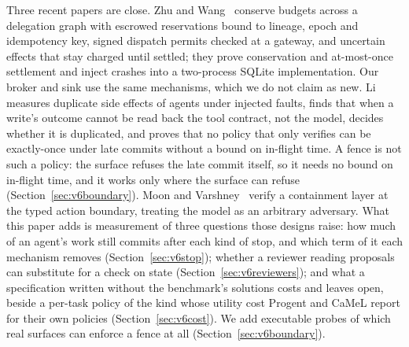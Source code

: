  Three recent papers are close. Zhu and Wang~\cite{ftbudget} conserve budgets across a delegation graph with escrowed reservations bound to lineage, epoch and idempotency key, signed dispatch permits checked at a gateway, and uncertain effects that stay charged until settled; they prove conservation and at-most-once settlement and inject crashes into a two-process SQLite implementation. Our broker and sink use the same mechanisms, which we do not claim as new. Li~\cite{limbo} measures duplicate side effects of agents under injected faults, finds that when a write's outcome cannot be read back the tool contract, not the model, decides whether it is duplicated, and proves that no policy that only verifies can be exactly-once under late commits without a bound on in-flight time. A fence is not such a policy: the surface refuses the late commit itself, so it needs no bound on in-flight time, and it works only where the surface can refuse (Section~\ref{sec:v6boundary}). Moon and Varshney~\cite{moon} verify a containment layer at the typed action boundary, treating the model as an arbitrary adversary. What this paper adds is measurement of three questions those designs raise: how much of an agent's work still commits after each kind of stop, and which term of it each mechanism removes (Section~\ref{sec:v6stop}); whether a reviewer reading proposals can substitute for a check on state (Section~\ref{sec:v6reviewers}); and what a specification written without the benchmark's solutions costs and leaves open, beside a per-task policy of the kind whose utility cost Progent and CaMeL report for their own policies (Section~\ref{sec:v6cost}). We add executable probes of which real surfaces can enforce a fence at all (Section~\ref{sec:v6boundary}).
